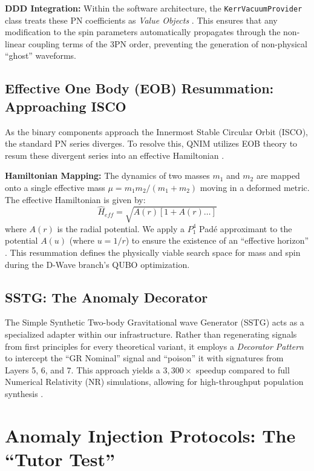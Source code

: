 \documentclass[11pt,a4paper,spanish]{book}
\numberwithin{equation}{chapter}
\numberwithin{figure}{chapter}
\numberwithin{equation}{chapter}
\numberwithin{figure}{chapter}
\numberwithin{table}{chapter}
\begin{document}
\textbf{DDD Integration:} Within the software architecture, the \texttt{KerrVacuumProvider} class treats these PN coefficients as \textit{Value Objects} \cite{thinktecture_value_objects}. This ensures that any modification to the spin parameters automatically propagates through the non-linear coupling terms of the 3PN order, preventing the generation of non-physical ``ghost'' waveforms.

\subsection{Effective One Body (EOB) Resummation: Approaching ISCO}

As the binary components approach the Innermost Stable Circular Orbit (ISCO), the standard PN series diverges. To resolve this, QNIM utilizes EOB theory to resum these divergent series into an effective Hamiltonian \cite{indico_eob_part4, researchgate_eob_description}.

\textbf{Hamiltonian Mapping:} The dynamics of two masses $m_1$ and $m_2$ are mapped onto a single effective mass $\mu = m_1 m_2 / (m_1 + m_2)$ moving in a deformed metric. The effective Hamiltonian is given by:
\begin{equation}
    \hat{H}_{eff} = \sqrt{A(r) \left[ 1 + A(r) \dots \right]}
\end{equation}
where $A(r)$ is the radial potential. We apply a $P^4_1$ Padé approximant to the potential $A(u)$ (where $u=1/r$) to ensure the existence of an ``effective horizon'' \cite{emergentmind_eob}. This resummation defines the physically viable search space for mass and spin during the D-Wave branch's QUBO optimization.

\subsection{SSTG: The Anomaly Decorator}

The Simple Synthetic Two-body Gravitational wave Generator (SSTG) acts as a specialized adapter within our infrastructure. Rather than regenerating signals from first principles for every theoretical variant, it employs a \textit{Decorator Pattern} \cite{cs_tufts_design_patterns} to intercept the ``GR Nominal'' signal and ``poison'' it with signatures from Layers 5, 6, and 7. This approach yields a $3,300\times$ speedup compared to full Numerical Relativity (NR) simulations, allowing for high-throughput population synthesis \cite{arxiv_memory_hairy_bh}.

\section{Anomaly Injection Protocols: The ``Tutor Test''}
\end{document}
